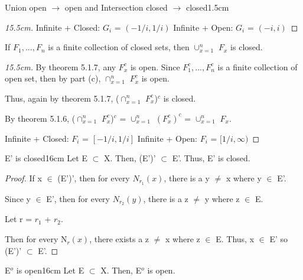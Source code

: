 \begin{ltheorem}{Union open $\rightarrow$ open and
	Intersection closed $\rightarrow$ closed}{1.5cm}
\begin{proof}[15.5cm]
				\vspace{0.1cm}

				{\color{purple} Infinite + Closed}: $G_i$ = $(-1/i,1/i)$
				\hfill
				{\color{purple} Infinite + Open}: $G_i$ = $(-i,i)$
			\end{proof}

		\item If $F_1, ... , F_n$ is a finite collection of closed sets,
		then $\cup_{x=1}^n$ $F_x$ is closed.

			\begin{proof}[15.5cm]
				By {\color{red} theorem 5.1.7}, any $F_x^c$ is open.
				Since $F_1^c, ... , F_n^c$ is a finite collection of
				open set, then by part (c), $\cap_{x=1}^n$ $F_x^c$ is open.

				Thus, again by {\color{red} theorem 5.1.7},
				($\cap_{x=1}^n$ $F_x^c$)$^c$ is closed.

				By {\color{red} theorem 5.1.6},
				($\cap_{x=1}^n$ $F_x^c$)$^c$ = $\cup_{x=1}^n$ $(F_x^c)^c$
				= $\cup_{x=1}^n$ $F_x$.

				\vspace{0.1cm}

				{\color{purple} Infinite + Closed}: $F_i$ = $[-1/i,1/i]$
				\hfill
				{\color{purple} Infinite + Open}: $F_i$ = $[1/i,\infty)$
			\end{proof}	 
	\end{ltheorem}

	\newpage



	\begin{wtheorem}{E' is closed}{16cm}
		Let  E $\subset$ X. Then, (E')' $\subset$ E'.
		Thus, E' is closed.
	\end{wtheorem}
	
	\begin{proof}
		If x $\in$ (E')', then for every $N_{r_1}(x)$, there is a
		y $\not =$ x where y $\in$ E'.
		
		Since y $\in$ E', then for every $N_{r_2}(y)$, there is a
		z $\not =$ y where z $\in$ E.

		Let r = $r_1$ + $r_2$.

		Then for every N$_r(x)$, there exists a z $\not =$ x where
		z $\in$ E.
		Thus, x $\in$ E' so (E')' $\subset$ E'.
	\end{proof}

	\vspace{0.5cm}



	\begin{wtheorem}{E$^o$ is open}{16cm}
		Let  E $\subset$ X. Then, E$^o$ is open. 
	\end{wtheorem}
	
